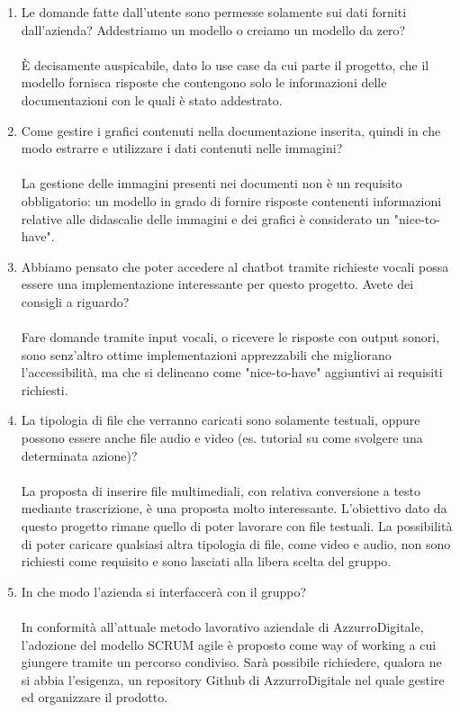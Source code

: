 \documentclass[12pt]{article}
\begin{document}
\begin{enumerate}
    \item Le domande fatte dall’utente sono permesse solamente sui dati forniti dall’azienda? Addestriamo un modello o creiamo un modello da zero?\\ \\
È decisamente auspicabile, dato lo use case da cui parte il progetto, che il modello fornisca risposte che contengono solo le informazioni delle documentazioni con le quali è stato addestrato. 
    \item Come gestire i grafici contenuti nella documentazione inserita, quindi in che modo estrarre e utilizzare i dati contenuti nelle immagini?\\ \\
La gestione delle immagini presenti nei documenti non è un requisito obbligatorio: un modello in grado di fornire risposte contenenti informazioni relative alle didascalie delle immagini e dei grafici è considerato un "nice-to-have".
    \item Abbiamo pensato che poter accedere al chatbot tramite richieste vocali possa essere una implementazione interessante per questo progetto. Avete dei consigli a riguardo? \\ \\
Fare domande tramite input vocali, o ricevere le risposte con output sonori, sono senz'altro ottime implementazioni apprezzabili che migliorano l'accessibilità, ma che si delineano come "nice-to-have" aggiuntivi ai requisiti richiesti.
    \item  La tipologia di file che verranno caricati sono solamente testuali, oppure possono essere anche file audio e video (es. tutorial su come svolgere una determinata azione)? \\ \\
La proposta di inserire file multimediali, con relativa conversione a testo mediante trascrizione, è una proposta molto interessante. L'obiettivo dato da questo progetto rimane quello di poter lavorare con file testuali. La possibilità di poter caricare qualsiasi altra tipologia di file, come video e audio, non sono richiesti come requisito e sono lasciati alla libera scelta del gruppo.
    \item In che modo l'azienda si interfaccerà con il gruppo?\\ \\
In conformità all'attuale metodo lavorativo aziendale di AzzurroDigitale, l'adozione del modello SCRUM agile è proposto come way of working a cui giungere tramite un percorso condiviso.
Sarà possibile richiedere, qualora ne si abbia l'esigenza, un repository Github di AzzurroDigitale nel quale gestire ed organizzare il prodotto.

\end{enumerate}
\end{document}
